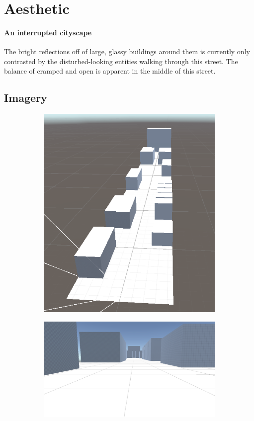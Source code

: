 \documentclass[letterpaper]{report}
\begin{document}
		\section{Aesthetic}
			\paragraph{An interrupted cityscape} The bright reflections off of large, glassy buildings around them is currently only contrasted by the disturbed-looking entities walking through this street. The balance of cramped and open is apparent in the middle of this street.
			
			\subsection{Imagery}
				\begin{figure}[H]
					\begin{subfigure}[h]{.32\linewidth}
						\includegraphics[width=\linewidth]{level1-1}
					\end{subfigure}
					\begin{subfigure}[h]{.32\linewidth}
						\includegraphics[width=\linewidth]{level1-2}

\end{subfigure}
\end{figure}
\end{document}
